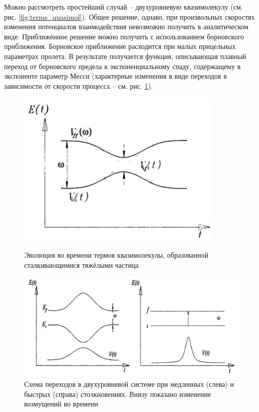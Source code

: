 \documentclass[10pt, a4paper]{article}
\numberwithin{equation}{section}
\begin{document}
Можно рассмотреть простейший случай -- двухуровневую квазимолекулу (см. рис. \ref{fig:terms_quasimol}). Общее решение, однако, при произвольных скоростях изменения потенциалов
взаимодействия невозможно получить в аналитическом виде. Приближённое решение можно получить с использованием борновского приближения. Борновское приближение расходится при малых прицельных параметрах пролета. В результате получается
функция, описывающая плавный переход от борновского предела
к экспоненциальному спаду, содержащему в экспоненте параметр Месси (характерные изменения в виде переходов в зависимости от скорости процесса -- см. рис. \ref{fig:transitions_2levels}).

\begin{figure}[h]
	\begin{center}
		\begin{minipage}[h]{0.49\linewidth}
			\includegraphics[width=1\linewidth]{heavy_particle.jpg}
			\caption{Эволюция во времени термов квазимолекулы, образованной
сталкивающимися тяжёлыми частица} 
			\label{fig:terms_quasimol}
		\end{minipage}
		\hfill
		\begin{minipage}[h]{0.49\linewidth}
			\includegraphics[width=1\linewidth]{2levels_transition.png}
			\caption{Схема переходов в двухуровневой системе при медленных
				(слева) и быстрых (справа) столкновениях. Внизу показано изменение
возмущений во времени}
			\label{fig:transitions_2levels}
		\end{minipage}
	\end{center}
\end{figure}
\end{document}
